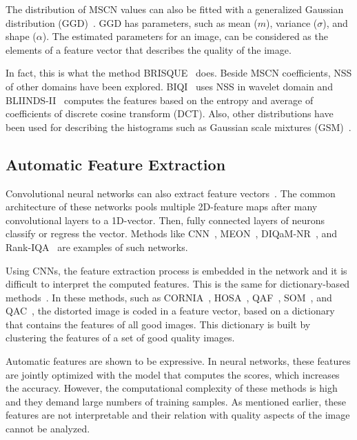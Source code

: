 The distribution of MSCN values can also be fitted with a generalized Gaussian distribution (GGD)~\cite{sharifi1995estimation}. GGD has parameters, such as mean ($m$), variance ($\sigma$), and shape ($\alpha$). The estimated parameters for an image, can be considered as the elements of a feature vector that describes the quality of the image.

In fact, this is what the method BRISQUE~\cite{Mittal2012a} does. Beside MSCN coefficients, NSS of other domains have been explored. BIQI~\cite{Moorthy2010} uses NSS in wavelet domain and BLIINDS-II~\cite{Saad2012} computes the features based on the entropy and average of coefficients of discrete cosine transform (DCT). Also, other distributions have been used for describing the histograms such as Gaussian scale mixtures (GSM)~\cite{Gupta2018}.
\subsection{Automatic Feature Extraction}
Convolutional neural networks can also extract feature vectors~\cite{Badrinarayanan2017}. The common architecture of these networks pools multiple 2D-feature maps after many convolutional layers to a 1D-vector. Then, fully connected layers of neurons classify or regress the vector. Methods like CNN~\cite{Kang2014}, MEON~\cite{Ma2017a}, DIQaM-NR~\cite{Bosse2018}, and Rank-IQA~\cite{liu2017rankiqa} are examples of such networks.

Using CNNs, the feature extraction process is embedded in the network and it is difficult to interpret the computed features. This is the same for dictionary-based methods~\cite{Jurie2005}. In these methods, such as CORNIA~\cite{Ye2012b}, HOSA~\cite{Xu2016}, QAF~\cite{Zhang2014}, SOM~\cite{Zhang2015b}, and QAC~\cite{Xue2013}, the distorted image is coded in a feature vector, based on a dictionary that contains the features of all good images. This dictionary is built by clustering the features of a set of good quality images.

Automatic features are shown to be expressive. In neural networks, these features are jointly optimized with the model that computes the scores, which increases the accuracy. However, the computational complexity of these methods is high and they demand large numbers of training samples. As mentioned earlier, these features are not interpretable and their relation with quality aspects of the image cannot be analyzed.

